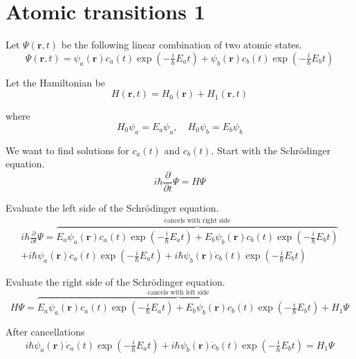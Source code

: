 

\section*{Atomic transitions 1}

Let $\Psi(\mathbf r,t)$ be the following linear combination of two atomic states.
\begin{equation*}
\Psi(\mathbf r,t)=\psi_a(\mathbf r)c_a(t)\exp\left(-\tfrac{i}{\hbar}E_at\right)+
\psi_b(\mathbf r)c_b(t)\exp\left(-\tfrac{i}{\hbar}E_bt\right)
\end{equation*}

Let the Hamiltonian be
\begin{equation*}
H(\mathbf r,t)=H_0(\mathbf r)+H_1(\mathbf r,t)
\end{equation*}

where
\begin{equation*}
H_0\psi_a=E_a\psi_a,\quad H_0\psi_b=E_b\psi_b
\end{equation*}

We want to find solutions for $c_a(t)$ and $c_b(t)$.
Start with the Schr\"odinger equation.
\begin{equation*}
i\hbar\frac{\partial}{\partial t}\Psi=H\Psi
\end{equation*}

Evaluate the left side of the Schr\"odinger equation.
\begin{multline*}
i\hbar\frac{\partial}{\partial t}\Psi
=\overbrace{E_a\psi_a(\mathbf r)c_a(t)\exp\left(-\tfrac{i}{\hbar}E_at\right)
+E_b\psi_b(\mathbf r)c_b(t)\exp\left(-\tfrac{i}{\hbar}E_bt\right)}^\text{cancels with right side}
\\
+i\hbar\psi_a(\mathbf r)\dot c_a(t)\exp\left(-\tfrac{i}{\hbar}E_at\right)
+i\hbar\psi_b(\mathbf r)\dot c_b(t)\exp\left(-\tfrac{i}{\hbar}E_bt\right)
\end{multline*}

Evaluate the right side of the Schr\"odinger equation.
\begin{equation*}
H\Psi
=\overbrace{E_a\psi_a(\mathbf r)c_a(t)\exp\left(-\tfrac{i}{\hbar}E_at\right)
+E_b\psi_b(\mathbf r)c_b(t)\exp\left(-\tfrac{i}{\hbar}E_bt\right)}^\text{cancels with left side}
+H_1\Psi
\end{equation*}

After cancellations
\begin{equation*}
i\hbar\psi_a(\mathbf r)\dot c_a(t)\exp\left(-\tfrac{i}{\hbar}E_at\right)
+i\hbar\psi_b(\mathbf r)\dot c_b(t)\exp\left(-\tfrac{i}{\hbar}E_bt\right)
=H_1\Psi
\tag{1}
\end{equation*}

